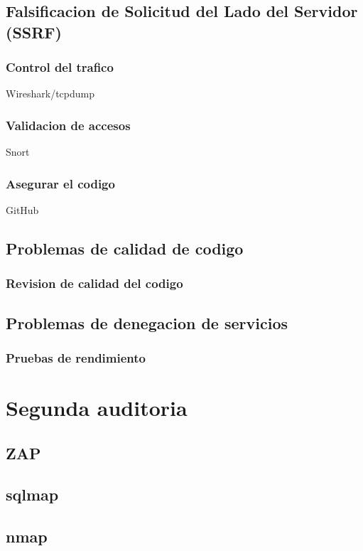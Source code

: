 \documentclass{report}
\begin{document}
        \section{Falsificacion de Solicitud del Lado del Servidor (SSRF)}
            \subsection{Control del trafico}
               Wireshark/tcpdump
            \clearpage
            \subsection{Validacion de accesos}
                Snort
            \clearpage
            \subsection{Asegurar el codigo}
                GitHub
            \clearpage
        \section{Problemas de calidad de codigo}
            \subsection{Revision de calidad del codigo}
            \clearpage
        \section{Problemas de denegacion de servicios}
            \subsection{Pruebas de rendimiento}
            \clearpage
    \chapter{Segunda auditoria}
        \section{ZAP}
        \section{sqlmap}
        \section{nmap}
\end{document}
